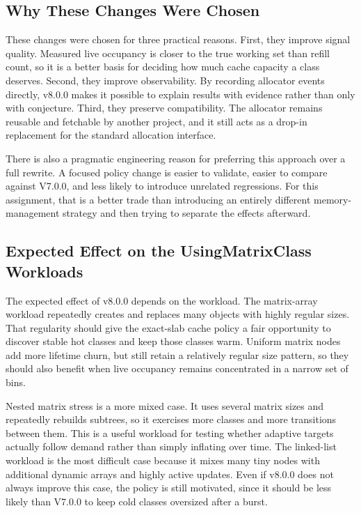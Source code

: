 \subsection{Why These Changes Were Chosen}

These changes were chosen for three practical reasons. First, they improve signal quality. Measured live
occupancy is closer to the true working set than refill count, so it is a better basis for deciding how much
cache capacity a class deserves. Second, they improve observability. By recording allocator events directly,
v8.0.0 makes it possible to explain results with evidence rather than only with conjecture. Third, they
preserve compatibility. The allocator remains reusable and fetchable by another project, and it still acts
as a drop-in replacement for the standard allocation interface.

There is also a pragmatic engineering reason for preferring this approach over a full rewrite. A focused
policy change is easier to validate, easier to compare against V7.0.0, and less likely to introduce unrelated
regressions. For this assignment, that is a better trade than introducing an entirely different
memory-management strategy and then trying to separate the effects afterward.

\subsection{Expected Effect on the UsingMatrixClass Workloads}

The expected effect of v8.0.0 depends on the workload. The matrix-array workload repeatedly creates and
replaces many objects with highly regular sizes. That regularity should give the exact-slab cache policy a
fair opportunity to discover stable hot classes and keep those classes warm. Uniform matrix nodes add more
lifetime churn, but still retain a relatively regular size pattern, so they should also benefit when live
occupancy remains concentrated in a narrow set of bins.

Nested matrix stress is a more mixed case. It uses several matrix sizes and repeatedly rebuilds subtrees, so
it exercises more classes and more transitions between them. This is a useful workload for testing whether
adaptive targets actually follow demand rather than simply inflating over time. The linked-list workload is
the most difficult case because it mixes many tiny nodes with additional dynamic arrays and highly active
updates. Even if v8.0.0 does not always improve this case, the policy is still motivated, since it should be
less likely than V7.0.0 to keep cold classes oversized after a burst.


